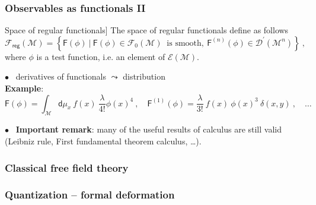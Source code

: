 \documentclass[9pt]{beamer}
\newcommand{\Dcal}{\mathcal{D}}
\newcommand{\Ecal}{\mathcal{E}}
\newcommand{\Fcal}{\mathcal{F}}
\newcommand{\Mcal}{\mathcal{M}}
\newcommand{\Fsf}{\mathsf{F}}
\newcommand{\dsf}{\mathsf{d}}
\begin{document}

\begin{frame}

\frametitle{Observables as functionals II}

\vfill

\begin{definition}Space of regular functionals]
The space of regular functionals define as follows
%
\begin{equation*}
\Fcal_{\mathsf{reg}}(\Mcal) = \left\{ \Fsf(\phi) \ \bigg| \ \Fsf(\phi) \in \Fcal_0(\Mcal) \ \mbox{ is smooth}, \ \Fsf^{(n)}(\phi) \in \Dcal^\prime(\Mcal^{n}) \right\} \ ,
\end{equation*}
%
where $\phi$ is a test function, i.e. an element of $\Ecal(\Mcal)$.
\end{definition}

\vfill

$\bullet$ \ derivatives of functionals $\leadsto$ distribution \\
\hspace*{8pt} \textbf{Example}: 
\begin{equation*}
\Fsf(\phi) = \int_\Mcal \dsf\mu_x \ f(x) \ \frac{\lambda}{4!} \phi(x)^4 \ , \quad \Fsf^{(1)}(\phi) =  \frac{\lambda}{3!} \ f(x) \ \phi(x)^3 \ \delta(x,y) \ , \quad \dots
\end{equation*}

\vfill

$\bullet$ \ \textbf{Important remark}: many of the useful results of calculus are still valid (Leibniz rule, First fundamental theorem calculus, \dots). \\[5pt]

\vfill

\end{frame}


\begin{frame}

\frametitle{Classical free field theory}

\end{frame}


\begin{frame}

\frametitle{Quantization -- formal deformation}


\end{frame}  

\end{document}
